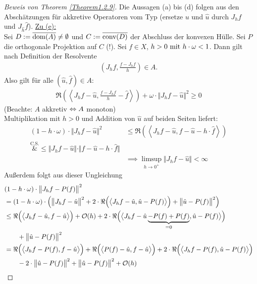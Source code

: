\begin{proof}[Beweis von Theorem \ref{Theorem1.2.9}]\enter
Die Aussagen (a) bis (d) folgen aus den Abschätzungen für akkretive Operatoren vom Typ (ersetze $u$ und $\hat{u}$ durch $J_hf$ und $J_{\hat{h}}\hat{f}$).\nl
\underline{Zu (e):}\\
Sei $D:=\overline{\dom(A)}\neq\emptyset$  und $C:=\overline{\conv(D)}$ der Abschluss der konvexen Hülle. Sei $P$ die orthogonale Projektion  auf $C$ (!). Sei $f\in X$, $h>0\mit h\cdot\omega<1$. Dann gilt nach Definition der Resolvente
\begin{align*}
\left( J_h f,\frac{f-J_h f}{h}\right)\in A.
\end{align*}
Also gilt für alle $(\hat{u},\hat{f})\in A$:
\begin{align*}
\Re\left(\left\langle J_h f-\hat{u},\frac{f-J_h f}{h}-\hat{f}\right\rangle\right)+\omega\cdot\big\Vert J_h f-\hat{u}\big\Vert^2\geq0
\end{align*}
(Beachte: $A$ akkretiv $\gdw A$ monoton)\\
Multiplikation mit $h>0$ und Addition von $\hat{u}$ auf beiden Seiten  liefert:
\begin{align*}
(1-h\cdot\omega)\cdot\big\Vert J_h f-\hat{u}\big\Vert^2
&\leq
\Re\left(\left\langle J_h f-\hat{u},f-\hat{u}-h\cdot \hat{f}\right\rangle\right)\\
\overset{\text{C.S.}}&{\leq}
\big\Vert J_h f-\hat{u}\big\Vert\cdot\Vert f-\hat{u}-h\cdot\hat{f}\big\Vert\\
&\implies
\limsup\limits_{h\to 0^+}\big\Vert J_h f-\hat{u}\big\Vert<\infty
\end{align*}
Außerdem folgt aus dieser Ungleichung
\begin{align*}
&(1-h\cdot\omega)\cdot\big\Vert J_h f- P(f)\big\Vert^2\\
&=(1-h\cdot\omega)\cdot\left(\big\Vert J_h f-\hat{u}\big\Vert^2+2\cdot\Re\Big(\big\langle J_h f-\hat{u},\hat{u}-P(f)\big\rangle\Big)+\big\Vert\hat{u}-P(f)\big\Vert^2\right)\\
&\leq
\Re\Big(\big\langle J_h f-\hat{u},f-\hat{u}\big\rangle\Big)+\O(h)
+2\cdot\Re\Big(\big\langle J_h f-\hat{u}\underbrace{-P(f)+P(f)}_{=0},\hat{u}-P(f)\big\rangle\Big)\\
&\qquad+\big\Vert\hat{u}-P(f)\big\Vert^2\\
&=
\Re\Big(\big\langle J_h f-P(f),f-\hat{u}\big\rangle\Big)
+\Re\Big(\big\langle P(f)-\hat{u},f-\hat{u}\big\rangle\Big)
+2\cdot\Re\Big(\big\langle J_h f-P(f),\hat{u}-P(f)\big\rangle\Big)\\
&\qquad-2\cdot\big\Vert\hat{u}-P(f)\big\Vert^2+\big\Vert\hat{u}-P(f)\big\Vert^2+\O(h)\\

\end{align*}
\end{proof}
